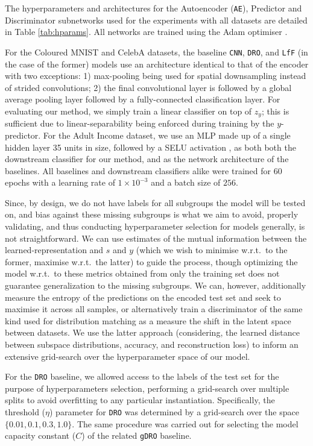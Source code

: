 The hyperparameters and architectures for the Autoencoder (\texttt{AE}), Predictor and Discriminator subnetworks used for the experiments with all datasets are detailed in Table \ref{tab:hparams}. All networks are trained using the Adam optimiser \citep{kingma2015adam}.

For the Coloured MNIST and CelebA datasets, the baseline \texttt{CNN}, \texttt{DRO}, and \texttt{LfF} (in the case of the former) models use an architecture identical to that of the encoder with two exceptions: 1) max-pooling being used for spatial downsampling instead of strided convolutions; 2) the final convolutional layer is followed by a global average pooling layer followed by a fully-connected classification layer. For evaluating our method, we simply train a linear classifier on top of $z_y$; this is sufficient due to linear-separability being enforced during training by the $y$-predictor.
For the Adult Income dataset, we use an MLP made up of a single hidden layer 35 units in size, followed by a SELU activation \citep{klambauer2017self}, as both both the downstream classifier for our method, and as the network architecture of the baselines. 
All baselines and downstream classifiers alike were trained for $60$ epochs with a learning rate of $1 \times 10^{-3}$ and a batch size of $256$.

Since, by design, we do not have labels for all subgroups the model will be tested on, and bias against these missing subgroups is what we aim to avoid, properly validating, and thus conducting hyperparameter selection for models generally, is not straightforward.
We can use estimates of the mutual information between the learned-representation and $s$ and $y$ (which we wish to minimise w.r.t.\ to the former, maximise w.r.t.\ the latter) to guide the process, though optimizing the model w.r.t.\ to these metrics obtained from only the training set does not guarantee generalization to the missing subgroups.
We can, however, additionally measure the entropy of the predictions on the encoded test set and seek to maximise it across all samples, or alternatively train a discriminator of the same kind used for distribution matching as a measure the shift in the latent space between datasets.
We use the latter approach (considering, the learned distance between subspace distributions, accuracy, and reconstruction loss) to inform an extensive grid-search over the hyperparameter space of our model.

For the \texttt{DRO} baseline, we allowed access to the labels of the test set for the purpose of hyperparameters selection, performing a grid-search over multiple splits to avoid overfitting to any particular instantiation.
Specifically, the threshold ($\eta$) parameter for \texttt{DRO} was determined by a grid-search over the space $\{0.01, 0.1, 0.3, 1.0\}$. The same procedure was carried out for selecting the model capacity constant ($C$) of the related \texttt{gDRO} baseline.

